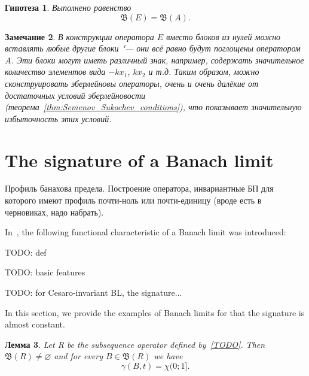 \documentclass[a4paper,14pt]{article} %
\newcommand{\B}{\ensuremath{\mathfrak{B}}}
\theoremstyle{plain}
\newtheorem{lemma}{Лемма}[section]
\newtheorem{remark}[lemma]{Замечание}
\newtheorem{hypothesis}[lemma]{Гипотеза}
\begin{document}
\begin{hypothesis}
	Выполнено равенство
	\begin{equation}
		\B(E) = \B(A)
		.
	\end{equation}
\end{hypothesis}

\begin{remark}
	В конструкции оператора $E$ вместо блоков из нулей можно вставлять любые другие блоки "---
	они всё равно будут поглощены оператором $A$.
	Эти блоки могут иметь различный знак, например, содержать значительное количество
	элементов вида $-kx_1$, $kx_2$ и т.д.
	Таким образом, можно сконструировать эберлейновы операторы, очень и очень далёкие
	от достаточных условий эберлейновости (теорема~\ref{thm:Semenov_Sukochev_conditions}),
	что показывает значительную избыточность этих условий.
\end{remark}




\section{The signature of a Banach limit}

{Профиль банахова предела. Построение оператора, инвариантные БП для которого имеют профиль почти-ноль или почти-единицу (вроде есть в черновиках, надо набрать).}

In~\cite{TODO}, the following functional characteristic of a Banach limit was introduced:

TODO: def

TODO: basic features

TODO: for Cesaro-invariant BL, the signature...

In this section, we provide the examples of Banach limits for that the signature is almost constant.

\begin{lemma}
	Let R be the subsequence operator
	defined by~\eqref{TODO}.
	Then $\B(R) \ne\varnothing$ and for every $B\in \B(R)$ we have
	\begin{equation}
		\gamma(B, t) = \chi(0;1]
		.
	\end{equation}
\end{lemma}
\end{document}
